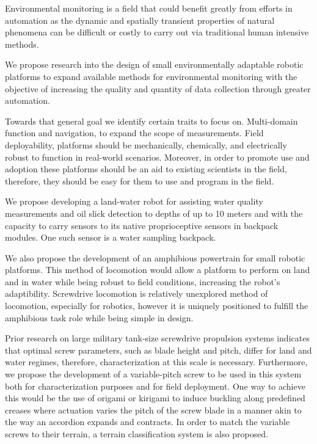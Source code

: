 \documentclass{article}
\begin{document}
\begin{singlespace}
  

Environmental monitoring is a field that could benefit greatly from efforts in automation as the dynamic and spatially transient properties of natural phenomena can be difficult or costly to carry out via traditional human intensive methods. 

We propose research into the design of small environmentally adaptable robotic platforms to expand available methods for environmental monitoring with the objective of increasing the quality and quantity of data collection through greater automation. 

Towards that general goal we identify certain traits to focus on. Multi-domain function and navigation, to expand the scope of measurements. Field deployability, platforms should be mechanically, chemically, and electrically robust to function in real-world scenarios. Moreover, in order to promote use and adoption these platforms should be an aid to existing scientists in the field, therefore, they should be easy for them to use and program in the field. 

We propose developing a land-water robot for assisting water quality measurements and oil slick detection to depths of up to 10 meters and with the capacity to carry sensors to its native proprioceptive sensors in backpack modules. One such sensor is a water sampling backpack. 

We also propose the development of an amphibious powertrain for small robotic platforms. This method of locomotion would allow a platform to perform on land and in water while being robust to field conditions, increasing the robot's adaptibility. Screwdrive locomotion is relatively unexplored method of locomotion, especially for robotics, however it is uniquely positioned to fulfill the amphibious task role while being simple in design. 

Prior research on large military tank-size screwdrive propulsion systems indicates that optimal screw parameters, such as blade height and pitch, differ for land and water regimes, therefore, characterization at this scale is necessary. Furthermore, we propose the development of a variable-pitch screw to be used in this system both for characterization purposes and for field deployment. One way to achieve this would be the use of origami or kirigami to induce buckling along predefined creases where actuation varies the pitch of the screw blade in a manner akin to the way an accordion expands and contracts. In order to match the variable screws to their terrain, a terrain classification system is also proposed.  


\end{singlespace}
\end{document}
